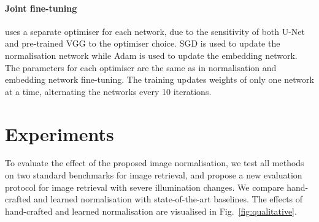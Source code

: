 \begin{figure*}
\paragraph{Joint fine-tuning} uses a separate optimiser for each network, due to the sensitivity of both U-Net and pre-trained VGG to the optimiser choice. SGD is used to update the normalisation network while Adam is used to update the embedding network. The parameters for each optimiser are the same as in normalisation and embedding network fine-tuning. The training updates weights of only one network at a time, alternating the networks every 10 iterations.


\section{Experiments} \label{sec:experiments}

To evaluate the effect of the proposed image normalisation, we test all methods on two standard benchmarks for image retrieval, and propose a new evaluation protocol for image retrieval with severe illumination changes. We compare hand-crafted and learned normalisation with state-of-the-art baselines. The effects of hand-crafted and learned normalisation are visualised in Fig.~\ref{fig:qualitative}.


\end{figure*}
